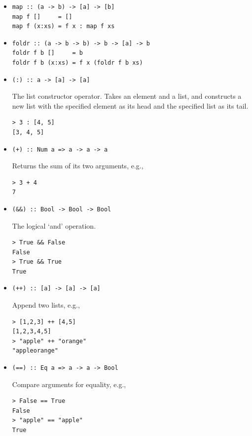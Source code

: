 \documentclass[addpoints]{exam}
\begin{document}
\begin{itemize}

\item
\begin{verbatim}
map :: (a -> b) -> [a] -> [b]
map f []     = []
map f (x:xs) = f x : map f xs
\end{verbatim}

\item
\begin{verbatim}
foldr :: (a -> b -> b) -> b -> [a] -> b
foldr f b []     = b
foldr f b (x:xs) = f x (foldr f b xs)
\end{verbatim}

\item
\begin{verbatim}
(:) :: a -> [a] -> [a]
\end{verbatim}
The list constructor operator.  Takes an element and a list, and constructs a new list with the specified element as its head and the specified list as its tail.
\begin{verbatim}
> 3 : [4, 5]
[3, 4, 5]
\end{verbatim}

\item
\begin{verbatim}
(+) :: Num a => a -> a -> a
\end{verbatim}
Returns the sum of its two arguments, e.g.,
\begin{verbatim}
> 3 + 4
7
\end{verbatim}

\item
\begin{verbatim}
(&&) :: Bool -> Bool -> Bool
\end{verbatim}
The logical `and' operation.
\begin{verbatim}
> True && False
False
> True && True
True
\end{verbatim}

\item
\begin{verbatim}
(++) :: [a] -> [a] -> [a]
\end{verbatim}
Append two lists, e.g.,
\begin{verbatim}
> [1,2,3] ++ [4,5]
[1,2,3,4,5]
> "apple" ++ "orange"
"appleorange"
\end{verbatim}

\item
\begin{verbatim}
(==) :: Eq a => a -> a -> Bool
\end{verbatim}
Compare arguments for equality, e.g., 
\begin{verbatim}
> False == True
False
> "apple" == "apple"
True
\end{verbatim}

\end{itemize}
\end{document}
